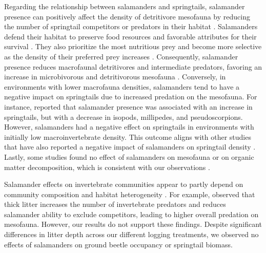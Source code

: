 Regarding the relationship between salamanders and springtails, salamander presence can positively affect the density of detritivore mesofauna by reducing the number of springtail competitors or predators in their habitat \citep{Wyman1998Experimentalassessment,Rooney2000impactsalamander,Walton2005Contrastingeffects,Walton2006Salamandersforestfloor}. 
Salamanders defend their habitat to preserve food resources and favorable attributes for their survival \citep{Gall2003BehavioralInteractions,Hickerson2004Behavioralinteractions,Hickerson2012Interactionsforestfloor}. 
They also prioritize the most nutritious prey and become more selective as the density of their preferred prey increases \citep{Jaeger1981Foragingtactics,Jaeger1982ForagingTactics}. 
Consequently, salamander presence reduces macrofaunal detritivores and intermediate predators, favoring an increase in microbivorous and detritivorous mesofauna \citep{Rooney2000impactsalamander,Walton2005Contrastingeffects,Walton2006Salamandersforestfloor}. 
Conversely, in environments with lower macrofauna densities, salamanders tend to have a negative impact on springtails due to increased predation on the mesofauna. 
For instance, \cite{Walton2006Salamandersforestfloor} reported that salamander presence was associated with an increase in springtails, but with a decrease in isopods, millipedes, and pseudoscorpions. 
However, salamanders had a negative effect on springtails in environments with initially low macroinvertebrate density. 
This outcome aligns with other studies that have also reported a negative impact of salamanders on springtail density \citep{Hickerson2017Easternredbacked}. 
Lastly, some studies found no effect of salamanders on mesofauna or on organic matter decomposition, which is consistent with our observations \citep{Hocking2013Effectsexperimental,Hocking2014Effectsredbacked}.

Salamander effects on invertebrate communities appear to partly depend on community composition and habitat heterogeneity \citep{MichaelWalton2005Salamandersforestfloor,Walton2006Salamandersforestfloor,Walton2013Topdownregulation,Best2014trophicrole}. 
For example, \cite{Walton2013Topdownregulation} observed that thick litter increases the number of invertebrate predators and reduces salamander ability to exclude competitors, leading to higher overall predation on mesofauna. 
However, our results do not support these findings. 
Despite significant differences in litter depth across our different logging treatments, we observed no effects of salamanders on ground beetle occupancy or springtail biomass.



